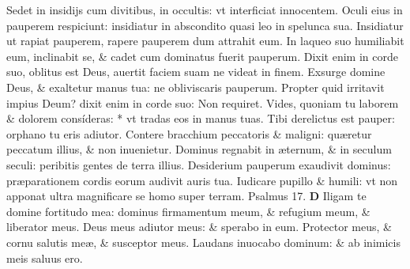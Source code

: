 \documentclass[a5paper,10pt]{book}
\def\ae{æ}
\begin{document}
\begin{multicols*}{2}
\newline \color{red} S\color{black}edet in insidijs cum divitibus, in occultis: vt interficiat innocentem.
\newline \color{red} O\color{black}culi eius in pauperem respiciunt: insidiatur in abscondito quasi leo in spelunca sua.
\newline \color{red} I\color{black}nsidiatur ut rapiat pauperem, rapere pauperem dum attrahit eum.
\newline \color{red} I\color{black}n laqueo suo humiliabit eum, inclinabit se, \& cadet cum dominatus fuerit pauperum.
\newline \color{red} D\color{black}ixit enim in corde suo, oblitus est Deus, auertit faciem suam ne videat in finem.
\newline \color{red} E\color{black}xsurge domine Deus, \& exaltetur manus tua: ne obliviscaris pauperum.
\newline \color{red} P\color{black}ropter quid irritavit impius Deum? dixit enim in corde suo: Non requiret.
\newline \color{red} V\color{black}ides, quoniam tu laborem \& dolorem consíderas: * vt tradas eos in manus tuas.
\newline \color{red} T\color{black}ibi derelictus est pauper: orphano tu eris adiutor.
\newline \color{red} C\color{black}ontere bracchium peccatoris \& maligni: qu\ae retur peccatum illius, \& non inuenietur.
\newline \color{red} D\color{black}ominus regnabit in \ae ternum, \& in seculum seculi: peribitis gentes de terra illius.
\newline \color{red} D\color{black}esiderium pauperum exaudivit dominus: pr\ae parationem cordis eorum audivit auris tua.
\newline \color{red} I\color{black}udicare pupillo \& humili: vt non apponat ultra magnificare se homo super terram. \quad \color{red} Psalmus 17. \color{black}
\vspace{-1em}
\lettrine[lines=2]{\bfseries \color{red} D}{}
Iligam te domine fortitudo mea: dominus firmamentum meum, \& refugium meum, \& liberator meus.
\newline \color{red} D\color{black}eus meus adiutor meus: \& sperabo in eum.
\newline \color{red} P\color{black}rotector meus, \& cornu salutis me\ae , \& susceptor meus.
\newline \color{red} L\color{black}audans inuocabo dominum: \& ab inimicis meis saluus ero.

\end{multicols*}
\end{document}
